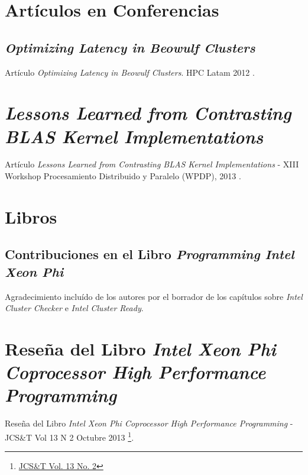 \documentclass[a4paper]{report}
\begin{document}
\section{Artículos en Conferencias}

\subsection{\it Optimizing Latency in Beowulf Clusters}

Artículo {\it Optimizing Latency in Beowulf Clusters}. HPC Latam 2012 \cite{latency}.



\section{{\it Lessons Learned from Contrasting BLAS Kernel Implementations}}

Artículo {\it Lessons Learned from Contrasting BLAS Kernel Implementations} - XIII Workshop Procesamiento Distribuido y Paralelo (WPDP), 2013 \cite{lessons}.



\section{Libros}

\subsection{Contribuciones en el Libro {\it Programming Intel Xeon Phi}}

Agradecimiento incluído de los autores por el borrador de los capítulos sobre {\it Intel Cluster Checker} e {\it Intel Cluster Ready}.

\section{Reseña del Libro {\it Intel Xeon Phi Coprocessor High Performance Programming}}

Reseña del Libro {\it Intel Xeon Phi Coprocessor High Performance Programming} - JCS\&T Vol 13 N 2 Octubre 2013 \footnote{\href{http://journal.info.unlp.edu.ar/journal/journal36/papers/JCST-Oct13-BR1.pdf}{JCS\&T Vol. 13 No. 2}}.


\end{document}
